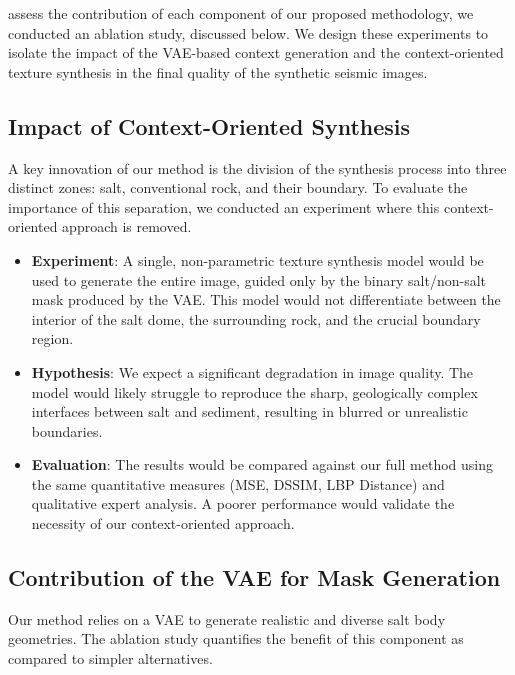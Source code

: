 \documentclass{ieeeaccess}
\begin{document}
 assess the contribution of each component of our proposed methodology, we conducted an ablation study, discussed below. We design these experiments to isolate the impact of the VAE-based context generation and the context-oriented texture synthesis in the final quality of the synthetic seismic images.

\subsection{Impact of Context-Oriented Synthesis}

A key innovation of our method is the division of the synthesis process into three distinct zones: salt, conventional rock, and their boundary. To evaluate the importance of this separation, we conducted an experiment where this context-oriented approach is removed.

\begin{itemize}
    \item \textbf{Experiment}: A single, non-parametric texture synthesis model would be used to generate the entire image, guided only by the binary salt/non-salt mask produced by the VAE. This model would not differentiate between the interior of the salt dome, the surrounding rock, and the crucial boundary region.
    \item \textbf{Hypothesis}: We expect a significant degradation in image quality. The model would likely struggle to reproduce the sharp, geologically complex interfaces between salt and sediment, resulting in blurred or unrealistic boundaries.
    \item \textbf{Evaluation}: The results would be compared against our full method using the same quantitative measures (MSE, DSSIM, LBP Distance) and qualitative expert analysis. A poorer performance would validate the necessity of our context-oriented approach.
\end{itemize}

\subsection{Contribution of the VAE for Mask Generation}

Our method relies on a VAE to generate realistic and diverse salt body geometries. The ablation study quantifies the benefit of this component as compared to simpler alternatives.
\end{document}
